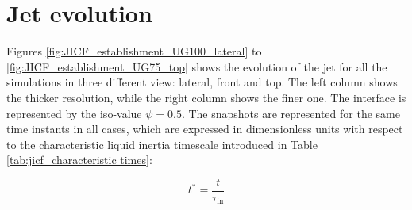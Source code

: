 



\section{Jet evolution}
\label{sec:ch5_jet_evolution}



Figures \ref{fig:JICF_establishment_UG100_lateral} to \ref{fig:JICF_establishment_UG75_top} shows the evolution of the jet for all the simulations in three different view: lateral, front and top. The left column shows the thicker resolution, while the right column shows the finer one. The interface is represented by the iso-value $\psi = 0.5$. The snapshots are represented for the same time instants in all cases, which are expressed in dimensionless units with respect to the characteristic liquid inertia timescale introduced in Table \ref{tab:jicf_characteristic times}:

\begin{equation}
\label{eq:t_dimensionless_with_tau_in}
t^* = \frac{t}{\tau_\mathrm{in}}
\end{equation}

